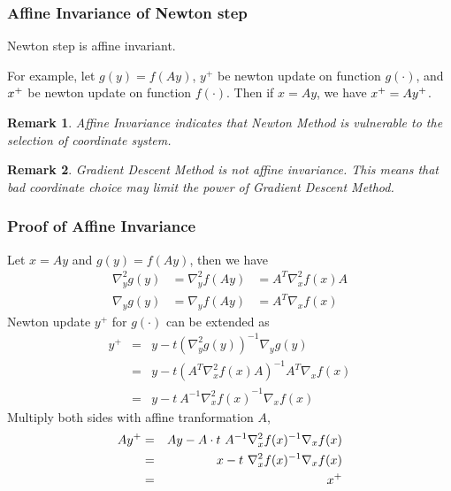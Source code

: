 \documentclass{beamer}
\newcommand{\be}{\begin{eqnarray}}
\newcommand{\ee}{\end{eqnarray}}
\newtheorem{remark}{Remark}
\begin{document}
\newcommand{\yp}{\ensuremath{y^{+}}}
\newcommand{\gradient}[3]{\ensuremath{\nabla_{#1} #2 (#3)}}
\newcommand{\hessian}[3]{\ensuremath{\nabla^2_{#1} #2 (#3)}}
\newcommand{\inv}{^{-1}}
\begin{frame}
\frametitle{Affine Invariance of Newton step}
\begin{lemma}
    Newton step is affine invariant. 
\end{lemma}

For example, let $g(y) = f(Ay)$, $\yp$ be newton update on function
$g(\cdot)$, and 
$x^{+}$ be newton update on function $f(\cdot)$. 
Then if $x=Ay$, we have $\xp = A\yp$.

\begin{remark}
    Affine Invariance indicates that Newton Method is vulnerable to the
    selection of coordinate system. 
\end{remark}
\begin{remark}
    Gradient Descent Method is not affine invariance. This means
    that bad coordinate choice may limit the power of Gradient Descent Method.
\end{remark}
\end{frame}

\begin{frame}
\frametitle{Proof of Affine Invariance}
    Let $x = Ay$ and $g(y) = f(Ay)$, then we have
    \be
    \hessian{y}{g}{y} &= \hessian{y}{f}{Ay} &= A^T \hessian{x}{f}{x} A \\
    \gradient{y}{g}{y} &= \gradient{y}{f}{Ay} &= A^T \gradient{x}{f}{x}
    \ee
    Newton update $\yp$ for $g(\cdot)$ can be extended as
    \be
    \yp &=& y - t(\hessian{y}{g}{y})\inv \gradient{y}{g}{y} \\
    &=& y - t(A^T \hessian{x}{f}{x} A)\inv A^T \gradient{x}{f}{x} \\
    &=& y - t\ A\inv \hessian{x}{f}{x}\inv \gradient{x}{f}{x}
    \ee
    Multiply both sides with affine tranformation $A$, 
    \be
    A\yp &=& Ay - A \cdot t\ A\inv \hessian{x}{f}{x}\inv \gradient{x}{f}{x} \\
    &=& x - t\ \hessian{x}{f}{x}\inv \gradient{x}{f}{x} \\
    &=& \xp
    \ee
\end{frame}
\end{document}

